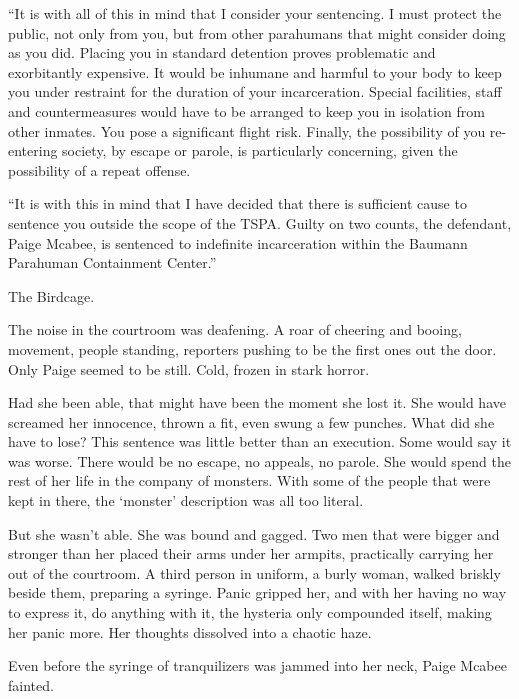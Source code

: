 ``It is with all of this in mind that I consider your sentencing.  I must protect the public, not only from you, but from other parahumans that might consider doing as you did.  Placing you in standard detention proves problematic and exorbitantly expensive.  It would be inhumane and harmful to your body to keep you under restraint for the duration of your incarceration.  Special facilities, staff and countermeasures would have to be arranged to keep you in isolation from other inmates.  You pose a significant flight risk.  Finally, the possibility of you re-entering society, by escape or parole, is particularly concerning, given the possibility of a repeat offense.



``It is with this in mind that I have decided that there is sufficient cause to sentence you outside the scope of the TSPA.  Guilty on two counts, the defendant, Paige Mcabee, is sentenced to indefinite incarceration within the Baumann Parahuman Containment Center.''



The Birdcage.



The noise in the courtroom was deafening.  A roar of cheering and booing, movement, people standing, reporters pushing to be the first ones out the door.  Only Paige seemed to be still.  Cold, frozen in stark horror.



Had she been able, that might have been the moment she lost it.  She would have screamed her innocence, thrown a fit, even swung a few punches.  What did she have to lose?  This sentence was little better than an execution.  Some would say it was worse.  There would be no escape, no appeals, no parole.  She would spend the rest of her life in the company of monsters.  With some of the people that were kept in there, the `monster' description was all too literal.



But she wasn't able.  She was bound and gagged.  Two men that were bigger and stronger than her placed their arms under her armpits, practically carrying her out of the courtroom.  A third person in uniform, a burly woman, walked briskly beside them, preparing a syringe.  Panic gripped her, and with her having no way to express it, do anything with it, the hysteria only compounded itself, making her panic more.  Her thoughts dissolved into a chaotic haze.



Even before the syringe of tranquilizers was jammed into her neck, Paige Mcabee fainted.



